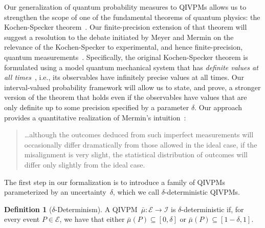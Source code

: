 \documentclass[english,reprint, aps, prl,superscriptaddress, showpacs,
showkeys, longbibliography, amsmath, amssymb, floatfix]{revtex4-1}
\theoremstyle{plain}
\theoremstyle{definition}
\newtheorem{definition}{Definition}
\newcommand{\events}{\ensuremath{\mathcal{E}}}
\begin{document}
Our generalization of quantum probability measures to QIVPMs allows us
to strengthen the scope of one of the fundamental theorems of quantum
physics: the Kochen-Specker
theorem~\cite{BELL_1966,kochenspecker1967,Redhead1987-REDINA,Mermin1990Simple,peres1995quantum,Jaeger2007,Held2016}. Our
finite-precision extension of that theorem will suggest a resolution
to the debate initiated by Meyer and Mermin on the relevance of the
Kochen-Specker to experimental, and hence finite-precision, quantum
measurements~\citep{PhysRevLett.83.3751,Mermin1999,Kent1999,HavlicekKrennSummhammerSvozil2001,SimonBruknerZeilinger2001,Cabello2002,Larsson2002,Appleby2002,BarrettKent2004,Appleby_2005,Spekkens2005,GuehneKleinmannCabelloEtAl2010,MazurekPuseyKunjwalEtAl2016}.
Specifically, the original Kochen-Specker theorem is formulated using
a model quantum mechanical system that has \emph{definite values at
  all times}~\cite{Held2016}, i.e., its observables have infinitely
precise values at all times. Our interval-valued probability framework
will allow us to state, and prove, a stronger version of the theorem
that holds even if the observables have values that are only definite
up to some precision specified by a parameter $\delta$. Our approach
provides a quantitative realization of Mermin's
intuition~\citep{Mermin1999}:
\begin{quote}
  \ldots although the outcomes deduced from such imperfect
  measurements will occasionally differ dramatically from those
  allowed in the ideal case, if the misalignment is very slight, the
  statistical distribution of outcomes will differ only slightly from
  the ideal case.
\end{quote}


The first step in our formalization is to introduce a family of QIVPMs
parameterized by an uncertainty~$\delta$, which we call
$\delta$-deterministic QIVPMs.

\begin{definition}[$\delta$-Determinism]\label{def:delta-deterministic} A
  QIVPM~$\bar{\mu}:\events\rightarrow\mathscr{I}$ is
  $\delta$-deterministic if, for every event $P\in\events$, we have
  that either 
  $\bar{\mu}\left(P\right)\subseteq\left[0,\delta\right]$ or
  $\bar{\mu}\left(P\right)\subseteq\left[1-\delta,1\right]$. 
\end{definition}
\end{document}
